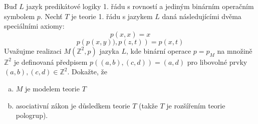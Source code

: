 Buď $L$ jazyk predikátové logiky 1. řádu s rovností a jediným binárním operačním
symbolem $p$. Nechť  $T$ je teorie 1. řádu s jazykem $L$ daná následujícími
dvěma speciálními axiomy:
$$p(x,x)=x$$
$$p\left ( p(x,y)),p(z,t) \right )=p(x,t)$$
Uvažujme realizaci $M\left ( \mathbb{Z}^{2},p \right )$ jazyka $L$, kde binární
operace $p=p_{M}$ na množině $\mathbb{Z}^{2}$ je definovaná předpisem $p\left (
(a,b),(c,d)\right )=(a,d) $ pro libovolné prvky $(a,b),(c,d)\in \mathbb{Z}^{2}$.
Dokažte, že

\begin{enumerate}[a)]
  \item $M$ je modelem teorie $T$
  \item asociativní zákon je důsledkem teorie $T$ (takže $T$ je rozšířením teorie pologrup).
\end{enumerate}
